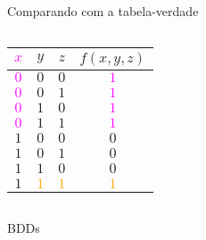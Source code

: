 \expandafter\documentclass\expandafter[table, usenames, svgnames, dvipsnames,14pt, \classopts]{beamer}
\begin{document}
\begin{frame}{Comparando com a tabela-verdade}
\begin{columns}[c]
            \begin{center}
                \small
                \begin{table}
                    \begin{tabular}{ccc|c}
                        \textcolor{magenta}{$x$} & $y$ & $z$ & $f(x,y,z)$\\
                        \hline
                        \textcolor{magenta}{$0$} & $0$ & $0$ & \textcolor{magenta}{$1$}\\
                        \textcolor{magenta}{$0$} & $0$ & $1$ & \textcolor{magenta}{$1$}\\
                        \textcolor{magenta}{$0$} & $1$ & $0$ & \textcolor{magenta}{$1$}\\
                        \textcolor{magenta}{$0$} & $1$ & $1$ & \textcolor{magenta}{$1$}\\
                        $1$ & $0$ & $0$ & $0$\\
                        $1$ & $0$ & $1$ & $0$\\
                        $1$ & $1$ & $0$ & $0$\\
                        $1$ & \textcolor{orange}{$1$} & \textcolor{orange}{$1$} & \textcolor{orange}{$1$}\\
                    \end{tabular}
                \end{table}
            \end{center}
    
    \end{columns}
    
\end{frame}

\begin{frame}{\uppercase{BDD}s}

    \begin{center}
    \end{center}

\end{frame}
\end{document}
